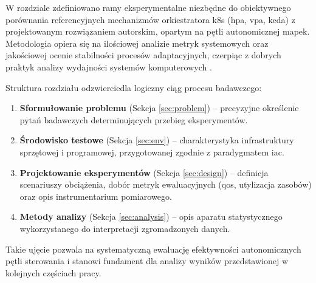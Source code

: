 W rozdziale zdefiniowano ramy eksperymentalne niezbędne do obiektywnego porównania referencyjnych mechanizmów orkiestratora 
\gls{k8s} (\acrshort{hpa}, \acrshort{vpa}, \acrshort{keda}) z projektowanym rozwiązaniem autorskim, opartym na pętli 
autonomicznej \acrshort{mapek}. Metodologia opiera się na ilościowej analizie metryk systemowych oraz jakościowej ocenie 
stabilności procesów adaptacyjnych, czerpiąc z dobrych praktyk analizy wydajności systemów komputerowych \cite{jain1991art}.

Struktura rozdziału odzwierciedla logiczny ciąg procesu badawczego:
\begin{enumerate}
    \item \textbf{Sformułowanie problemu} (Sekcja \ref{sec:problem}) -- precyzyjne określenie pytań badawczych determinujących 
      przebieg eksperymentów.
    \item \textbf{Środowisko testowe} (Sekcja \ref{sec:env}) -- charakterystyka infrastruktury sprzętowej i programowej, 
      przygotowanej zgodnie z paradygmatem \gls{iac}.
    \item \textbf{Projektowanie eksperymentów} (Sekcja \ref{sec:design}) -- definicja scenariuszy obciążenia, dobór metryk 
      ewaluacyjnych (\gls{qos}, utylizacja zasobów) oraz opis instrumentarium pomiarowego.
    \item \textbf{Metody analizy} (Sekcja \ref{sec:analysis}) -- opis aparatu statystycznego wykorzystanego do interpretacji 
      zgromadzonych danych.
\end{enumerate}

Takie ujęcie pozwala na systematyczną ewaluację efektywności autonomicznych pętli sterowania i stanowi fundament dla analizy wyników przedstawionej w kolejnych częściach pracy.



\label{sec:problem}



\label{sec:env}



\label{sec:design}



\label{sec:analysis}
